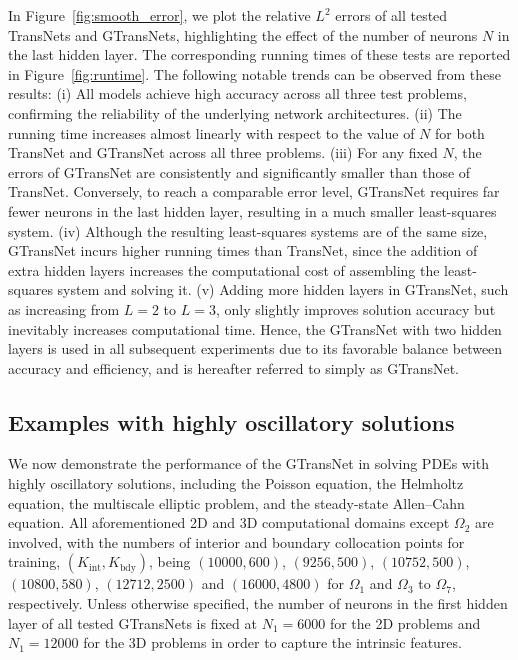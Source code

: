 \documentclass{article}
\begin{document}
In Figure~\ref{fig:smooth_error}, we plot the relative $L^2$ errors of all tested TransNets and GTransNets, highlighting the effect of the number of neurons $N$ in the last hidden layer. The corresponding running times of these tests are reported in Figure~\ref{fig:runtime}. The following notable trends can be observed from these results:
(i) All models achieve high accuracy across all three test problems, confirming the reliability of the underlying network architectures.
(ii) The running time increases almost linearly with respect to the value of $N$ for both TransNet and GTransNet across all three problems.
(iii) For any fixed $N$, the errors of GTransNet are consistently and significantly smaller than those of TransNet. Conversely, to reach a comparable error level, GTransNet requires far fewer neurons in the last hidden layer, resulting in a much smaller least-squares system.
(iv) Although the resulting least-squares systems are of the same size, GTransNet incurs higher running times than TransNet, since the addition of extra hidden layers increases the computational cost of assembling the least-squares system and solving it.
(v) Adding more hidden layers in GTransNet, such as increasing from $L = 2$ to $L = 3$, only slightly improves solution accuracy but inevitably increases computational time.
Hence, the GTransNet with two hidden layers is used in all subsequent experiments due to its favorable balance between accuracy and efficiency, and is hereafter referred to simply as GTransNet.

\subsection{Examples with highly oscillatory solutions}
We now demonstrate the performance of the GTransNet in solving PDEs with highly oscillatory solutions, including the Poisson equation, the Helmholtz equation, the multiscale elliptic problem, and the steady-state Allen–Cahn equation. All aforementioned 2D and 3D computational domains except $\Omega_2$ are involved, with the numbers of interior and boundary collocation points for training, $(K_{\mathrm{int}}, K_{\mathrm{bdy}})$, being $(10000, 600)$, $(9256, 500)$, $(10752, 500)$, $(10800, 580)$, $(12712, 2500)$ and $(16000,4800)$ for $\Omega_1$ and $\Omega_3$ to $\Omega_7$, respectively.
Unless otherwise specified, the number of neurons in the first hidden layer of all tested GTransNets is fixed at $N_1 = 6000$ for the 2D problems and $N_1 = 12000$ for the 3D problems in order to capture the intrinsic features.
\end{document}
